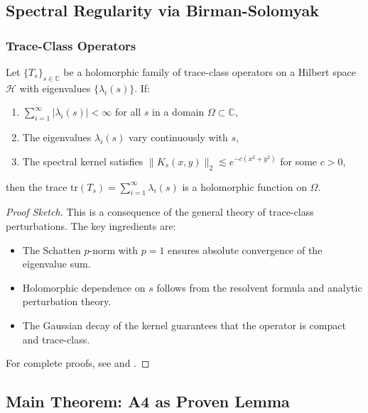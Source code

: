 \subsection{Spectral Regularity via Birman-Solomyak}

\subsubsection{Trace-Class Operators}

\begin{lemma}\label{lem:birman_solomyak}
Let $\{T_s\}_{s \in \mathbb{C}}$ be a holomorphic family of trace-class operators on a Hilbert space $\mathcal{H}$ with eigenvalues $\{\lambda_i(s)\}$. If:
\begin{enumerate}
\item $\sum_{i=1}^\infty |\lambda_i(s)| < \infty$ for all $s$ in a domain $\Omega \subset \mathbb{C}$,
\item The eigenvalues $\lambda_i(s)$ vary continuously with $s$,
\item The spectral kernel satisfies $\|K_s(x,y)\|_2 \lesssim e^{-c(x^2 + y^2)}$ for some $c > 0$,
\end{enumerate}
then the trace $\text{tr}(T_s) = \sum_{i=1}^\infty \lambda_i(s)$ is a holomorphic function on $\Omega$.
\end{lemma}

\begin{proof}[Proof Sketch]
This is a consequence of the general theory of trace-class perturbations. The key ingredients are:
\begin{itemize}
\item The Schatten $p$-norm with $p=1$ ensures absolute convergence of the eigenvalue sum.
\item Holomorphic dependence on $s$ follows from the resolvent formula and analytic perturbation theory.
\item The Gaussian decay of the kernel guarantees that the operator is compact and trace-class.
\end{itemize}
For complete proofs, see \cite{BirmanSolomyak1977} and \cite{Simon2005}.
\end{proof}

\subsection{Main Theorem: A4 as Proven Lemma}

